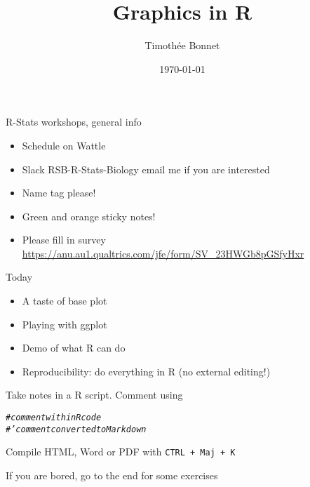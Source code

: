 \documentclass[10pt]{beamer}\usepackage[]{graphicx}\usepackage[]{color}
\title[\textbf{Graphics}]{Graphics in R}
\date{\today}
\author{Timoth\'ee Bonnet}
\institute{BDSI / RSB}
\makeatletter
\newcommand{\hlcom}[1]{\textcolor[rgb]{0.678,0.584,0.686}{\textit{#1}}}%
\newenvironment{kframe}{%
 \def\at@end@of@kframe{}%
 \ifinner\ifhmode%
  \def\at@end@of@kframe{\end{minipage}}%
  \begin{minipage}{\columnwidth}%
 \fi\fi%
 \def\FrameCommand##1{\hskip\@totalleftmargin \hskip-\fboxsep
 \colorbox{shadecolor}{##1}\hskip-\fboxsep
     \hskip-\linewidth \hskip-\@totalleftmargin \hskip\columnwidth}%
 \MakeFramed {\advance\hsize-\width
   \@totalleftmargin\z@ \linewidth\hsize
   \@setminipage}}%
 {\par\unskip\endMakeFramed%
 \at@end@of@kframe}
\newenvironment{knitrout}{}{} %
\makeatother
\begin{document}
\begin{frame}
\maketitle	
\end{frame}

\begin{frame}{R-Stats workshops, general info}

\begin{itemize}[<+->]
  \item Schedule on Wattle
  \item Slack RSB-R-Stats-Biology \alert{email me if you are interested}
  \item Name tag please!
  \item Green and orange sticky notes!
  \item Please fill in survey \url{https://anu.au1.qualtrics.com/jfe/form/SV_23HWGb8pGSfyHxr}
\end{itemize}



\end{frame}

\begin{frame}[fragile]{Today}

\begin{itemize}
  \item A taste of base plot
  \item Playing with ggplot
  \item Demo of what R can do
  \item Reproducibility: do everything in R (no external editing!)
\end{itemize}

\pause 
\begin{block}{}
Take notes in a R script. Comment using
\begin{knitrout}
\color{fgcolor}\begin{kframe}
\begin{alltt}
\hlcom{# comment within R code}
\hlcom{#' comment converted to Markdown}
\end{alltt}
\end{kframe}
\end{knitrout}
Compile HTML, Word or PDF with \texttt{CTRL + Maj + K}
\end{block}

\pause
If you are bored, go to the end for some exercises
\end{frame}
\end{document}
